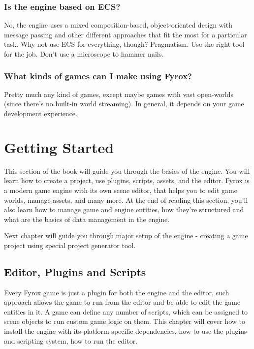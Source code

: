 \documentclass[
]{book}
\theoremstyle{definition}
\theoremstyle{definition}
\theoremstyle{definition}
\theoremstyle{definition}
\theoremstyle{remark}
\begin{document}
\subsection{Is the engine based on ECS?}\label{is-the-engine-based-on-ecs}

No, the engine uses a mixed composition-based, object-oriented design with message passing and other different approaches
that fit the most for a particular task. Why not use ECS for everything, though? Pragmatism. Use the right tool for the job.
Don't use a microscope to hammer nails.

\subsection{What kinds of games can I make using Fyrox?}\label{what-kinds-of-games-can-i-make-using-fyrox}

Pretty much any kind of games, except maybe games with vast open-worlds (since there's no built-in world streaming).
In general, it depends on your game development experience.

\chapter{Getting Started}\label{getting-started}

This section of the book will guide you through the basics of the engine. You will learn how to create a project, use plugins, scripts, assets, and the editor. Fyrox is a modern game engine with its own scene editor, that helps you to edit game worlds, manage assets, and many more. At the end of reading this section, you'll also learn how to manage game and engine entities, how they're structured and what are the basics of data management in the engine.

Next chapter will guide you through major setup of the engine - creating a game project using special project generator tool.

\section{Editor, Plugins and Scripts}\label{editor-plugins-and-scripts}

Every Fyrox game is just a plugin for both the engine and the editor, such approach allows the game to run from the editor and be able to edit the game entities in it. A game can define any number of scripts, which can be assigned to scene objects to run custom game logic on them. This chapter will cover how to install the engine with its platform-specific dependencies, how to use the plugins and scripting system, how to run the editor.
\end{document}
